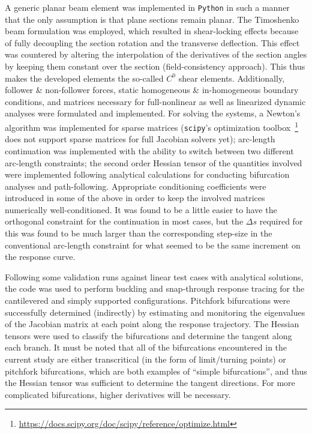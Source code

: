 \documentclass[10pt]{article}
\begin{document}
A generic planar beam element was implemented in \texttt{Python} in
such a manner that the only assumption is that plane sections remain
planar. The Timoshenko beam formulation was employed, which resulted
in shear-locking effects because of fully decoupling the section
rotation and the transverse deflection. This effect was countered by
altering the interpolation of the derivatives of the section angles by
keeping them constant over the section (field-consistency
approach). This thus makes the developed elements the so-called
$C^{0}$ shear elements. Additionally, follower \& non-follower forces,
static homogeneous \& in-homogeneous boundary conditions, and matrices
necessary for full-nonlinear as well as linearized dynamic analyses
were formulated and implemented. For solving the systems, a Newton's
algorithm was implemented for sparse matrices (\texttt{scipy}'s
optimization
toolbox~\footnote{\url{https://docs.scipy.org/doc/scipy/reference/optimize.html}}
does not support sparse matrices for full Jacobian solvers yet);
arc-length continuation was implemented with the ability to switch
between two different arc-length constraints; the second order Hessian
tensor of the quantities involved were implemented following
analytical calculations for conducting bifurcation analyses and
path-following. Appropriate conditioning coefficients were introduced
in some of the above in order to keep the involved matrices
numerically well-conditioned. It was found to be a little easier to
have the orthogonal constraint for the continuation in most cases, but
the $\Delta s$ required for this was found to be much larger than the
corresponding step-size in the conventional arc-length constraint for
what seemed to be the same increment on the response curve.

Following some validation runs against linear test cases with
analytical solutions, the code was used to perform buckling and
snap-through response tracing for the cantilevered and simply
supported configurations. Pitchfork bifurcations were successfully
determined (indirectly) by estimating and monitoring the eigenvalues
of the Jacobian matrix at each point along the response
trajectory. The Hessian tensors were used to classify the bifurcations
and determine the tangent along each branch. It must be noted that all
of the bifurcations encountered in the current study are either
transcritical (in the form of limit/turning points) or pitchfork
bifurcations, which are both examples of ``simple bifurcations'', and
thus the Hessian tensor was sufficient to determine the tangent
directions. For more complicated bifurcations, higher derivatives will
be necessary.
\end{document}

